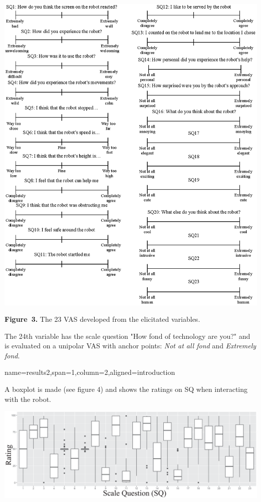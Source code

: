 \documentclass[paperwidth=118cm,paperheight=84cm,landscape,fontscale=0.2941]{baposter}
\begin{document}
\begin{poster}
{\vspace{-10pt}
\begin{center}
	\includegraphics[width=1.0\linewidth]{AllScalesSpaceBig.eps}

\textbf{Figure~3. }The 23 VAS developed from the elicitated variables.
\end{center}
\vspace{-15pt}

The 24th variable has the scale question "How fond of technology are you?" and is evaluated on a unipolar VAS with anchor points: \textit{Not at all fond} and \textit{Extremely fond}.
}



{name=results2,span=1,column=2,aligned=introduction}
{\parskip 5pt
A boxplot is made (see figure 4) and shows the ratings on SQ when interacting with the robot. 
\begin{center}

\vspace{-10pt}
	\includegraphics[width=0.9\linewidth]{Boksplot0er.eps}


\end{center}}
\end{poster}
\end{document}
